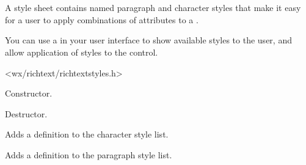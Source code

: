 \section{}\label{wxrichtextstylesheet}

A style sheet contains named paragraph and character styles that make it
easy for a user to apply combinations of attributes to a .

You can use a  in your
user interface to show available styles to the user, and allow application
of styles to the control.




<wx/richtext/richtextstyles.h>



\label{wxrichtextstylesheetwxrichtextstylesheet}


Constructor.

\label{wxrichtextstylesheetdtor}


Destructor.

\label{wxrichtextstylesheetaddcharacterstyle}


Adds a definition to the character style list.

\label{wxrichtextstylesheetaddparagraphstyle}


Adds a definition to the paragraph style list.

\label{wxrichtextstylesheetdeletestyles}


